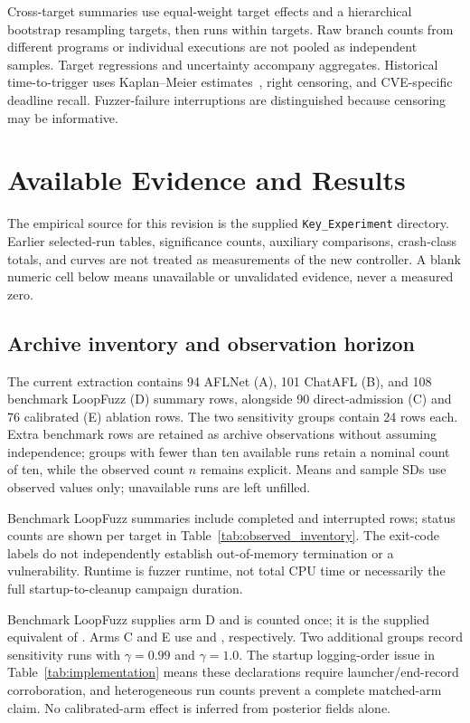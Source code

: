 \documentclass[final,5p,times,number]{elsarticle}
\begin{document}
Cross-target summaries use equal-weight target effects and a hierarchical bootstrap resampling targets, then runs within targets. Raw branch counts from different programs or individual executions are not pooled as independent samples. Target regressions and uncertainty accompany aggregates. Historical time-to-trigger uses Kaplan--Meier estimates~\cite{kaplan1958}, right censoring, and CVE-specific deadline recall. Fuzzer-failure interruptions are distinguished because censoring may be informative.


\section{Available Evidence and Results}
\label{sec:results}
The empirical source for this revision is the supplied \texttt{Key\_Experiment} directory. Earlier selected-run tables, significance counts, auxiliary comparisons, crash-class totals, and curves are not treated as measurements of the new controller. A blank numeric cell below means unavailable or unvalidated evidence, never a measured zero.

\subsection{Archive inventory and observation horizon}
The current extraction contains 94 AFLNet (A), 101 ChatAFL (B), and 108 benchmark LoopFuzz (D) summary rows, alongside 90 direct-admission (C) and 76 calibrated (E) ablation rows. The two sensitivity groups contain 24 rows each. Extra benchmark rows are retained as archive observations without assuming independence; groups with fewer than ten available runs retain a nominal count of ten, while the observed count $n$ remains explicit. Means and sample SDs use observed values only; unavailable runs are left unfilled.

Benchmark LoopFuzz summaries include completed and interrupted rows; status counts are shown per target in Table~\ref{tab:observed_inventory}. The exit-code labels do not independently establish out-of-memory termination or a vulnerability. Runtime is fuzzer runtime, not total CPU time or necessarily the full startup-to-cleanup campaign duration.

Benchmark LoopFuzz supplies arm D and is counted once; it is the supplied equivalent of . Arms C and E use  and , respectively. Two additional groups record sensitivity runs with $\gamma=0.99$ and $\gamma=1.0$. The startup logging-order issue in Table~\ref{tab:implementation} means these declarations require launcher/end-record corroboration, and heterogeneous run counts prevent a complete matched-arm claim. No calibrated-arm effect is inferred from posterior fields alone.
\end{document}

